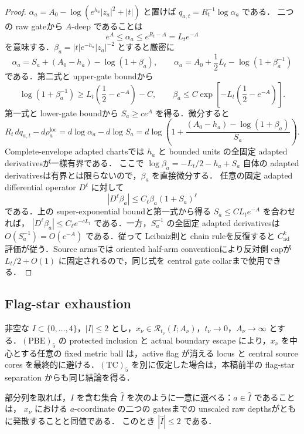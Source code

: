 \documentclass[a4paper,11pt]{ltjsarticle}
\numberwithin{equation}{section}
\theoremstyle{plain}
\theoremstyle{definition}
\theoremstyle{remark}
\begin{document}
\begin{proof}
$\alpha_a=A_0-\log(e^{h_a}|z_a|^2+|t|)$ と置けば $q_{a,t}=R_t^{-1}\log\alpha_a$ である．
二つの raw gateから $A$-deep であることは
\[
 e^A\le\alpha_a\le e^{R_t-A}=L_te^{-A}
\]
を意味する．$\beta_a=|t|e^{-h_a}|z_a|^{-2}$ とすると厳密に
\[
 \alpha_a=S_a+(A_0-h_a)-\log(1+\beta_a),
 \qquad
 \alpha_a=A_0+\frac12L_t-\log(1+\beta_a^{-1})
\]
である．第二式と upper-gate boundから
\[
 \log(1+\beta_a^{-1})\ge L_t\left(\frac12-e^{-A}\right)-C,
 \qquad
 \beta_a\le C\exp\!\left[-L_t\left(\frac12-e^{-A}\right)\right].
\]
第一式と lower-gate boundから $S_a\ge c e^A$ を得る．微分すると
\[
 R_t\,dq_{a,t}-d\rho_a^{\mathrm{loc}}
 =d\log\alpha_a-d\log S_a
 =d\log\!\left(1+\frac{(A_0-h_a)-\log(1+\beta_a)}{S_a}\right).
\]
Complete-envelope adapted chartsでは $h_a$ と bounded units の全固定 adapted derivativesが一様有界である．
ここで $\log\beta_a=-L_t/2-h_a+S_a$ 自体の adapted derivativesは有界とは限らないので，$\beta_a$ を直接微分する．
任意の固定 adapted differential operator $D^\ell$ に対して
\[
 |D^\ell\beta_a|\le C_\ell\beta_a(1+S_a)^\ell
\]
である．上の super-exponential boundと第一式から得る $S_a\le C L_te^{-A}$ を合わせれば，
$|D^\ell\beta_a|\le C_\ell e^{-cL_t}$ である．一方，$S_a^{-1}$ の全固定 adapted derivativesは
$O(S_a^{-1})=O(e^{-A})$ である．従って Leibniz則と chain ruleを反復すると
$C^k_{\mathrm{ad}}$ 評価が従う．Source armsでは oriented half-arm conventionにより反対側 capが $L_t/2+O(1)$ に固定されるので，同じ式を central gate collarまで使用できる．
\end{proof}

\subsection{Flag-star exhaustion}
非空な $I\subset\{0,\ldots,4\}$，$|I|\le2$ とし，$x_\nu\in\mathcal R_{t_\nu}(I;A_\nu)$，$t_\nu\to0$，$A_\nu\to\infty$ とする．$\mathrm{(PBE)}_5$ の protected inclusion と actual boundary escape により，$x_\nu$ を中心とする任意の fixed metric ball は，active flag が消える locus と central source cores を最終的に避ける．$\mathrm{(TC)}_5$ を別に仮定した場合は，本稿前半の flag-star separation からも同じ結論を得る．

\begin{lemma}\label{sharp:lem:partII-maximal-active-flag}
部分列を取れば，$I$ を含む集合 $\widehat I$ を次のように一意に選べる：$a\in\widehat I$ であることは，
$x_\nu$ における $a$-coordinate の二つの gatesまでの unscaled raw depthsがともに発散することと同値である．
このとき $|\widehat I|\le2$ である．
\end{lemma}
\end{document}
